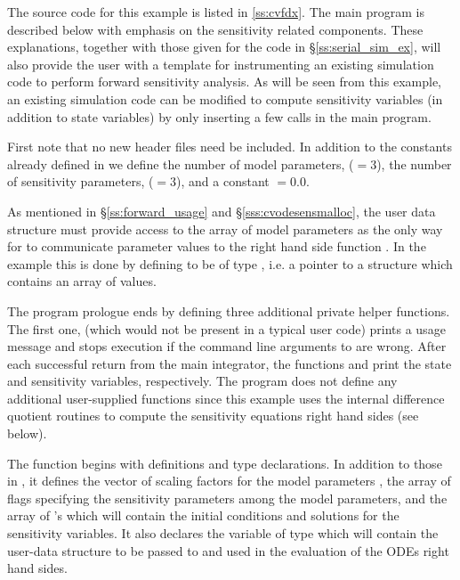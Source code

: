 The source code for this example is listed in \A\ref{ss:cvfdx}. The main program is described 
below with emphasis on the sensitivity related components. 
These explanations, together with those given for the code 
in \S\ref{ss:serial_sim_ex}, will also provide the user with a template for instrumenting 
an existing simulation code to perform forward sensitivity analysis.
As will be seen from this example, an existing simulation code can be modified to compute 
sensitivity variables (in addition to state variables) by only inserting a few {\cvodes} 
calls in the main program. 

First note that no new header files need be included. In addition to the constants already
defined in  we define the number of model parameters,  ($=3$),
the number of sensitivity parameters,  ($=3$), and a constant $=0.0$. 

As mentioned in \S\ref{ss:forward_usage} and \S\ref{sss:cvodesensmalloc}, the user data
structure  must provide access to the array of model parameters 
as the only way for {\cvodes} to communicate parameter values to the right hand side 
function . In the  example this is done by defining  to be 
of type , i.e. a pointer to a structure which contains an array of 
  values.

The program prologue ends by defining three additional private helper functions. The first
one,  (which would not be present in a typical user code) prints a usage
message and stops execution if the command line arguments to  are wrong.
After each successful return from the main {\cvodes} integrator, the functions 
 and  print the state and sensitivity variables,
respectively. The program does not define any additional user-supplied functions 
since this example uses the {\cvodes} internal difference quotient routines to compute
the sensitivity equations right hand sides (see below).

The  function begins with definitions and type declarations. In addition to 
those in , it defines the vector  of  scaling factors for
the model parameters , the array  of  flags specifying
the sensitivity parameters among the model parameters, and the array  of 
's which will contain the initial conditions and solutions for the sensitivity
variables. It also declares the variable  of type  
which will contain the user-data structure to be passed to {\cvodes} and used in the 
evaluation of the ODEs right hand sides.

